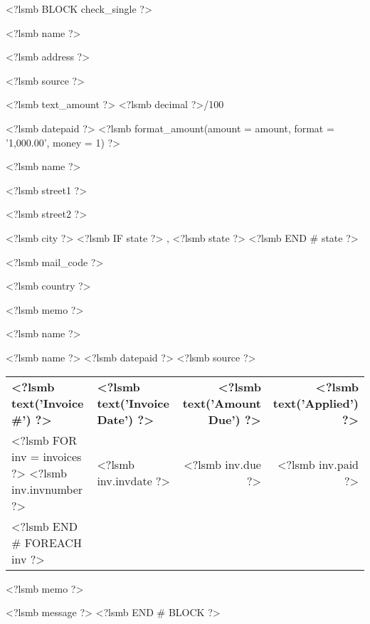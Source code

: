 <?lsmb BLOCK check_single ?>
\parbox[t]{12cm}{
  <?lsmb name ?>

  <?lsmb address ?>}
\hfill
\parbox[t]{6cm}{\hfill <?lsmb source ?>}

\vspace*{0.6cm}

<?lsmb text_amount ?> \dotfill <?lsmb decimal ?>/100 \makebox[0.5cm]{\hfill}

\vspace{0.5cm}

\hfill <?lsmb datepaid ?> \makebox[2cm]{\hfill} <?lsmb 
format_amount({amount = amount, format = '1,000.00', money = 1}) ?>


\vspace{0.5cm}

<?lsmb name ?>

<?lsmb street1 ?>

<?lsmb street2 ?>

<?lsmb city ?>
<?lsmb IF state ?>
\hspace{-0.1cm}, <?lsmb state ?>
<?lsmb END # state ?>

<?lsmb mail_code ?>

<?lsmb country ?>

\vspace{1.8cm}

<?lsmb memo ?>

\vspace{0.8cm}

<?lsmb name ?>

\vspace{0.5cm}

<?lsmb name ?> \hfill <?lsmb datepaid ?> \hfill <?lsmb source ?>

\vspace{0.5cm}
\begin{tabularx}{\textwidth}{lXrr@{}}
\textbf{<?lsmb text('Invoice #') ?>} & \textbf{<?lsmb text('Invoice Date') ?>}
  & \textbf{<?lsmb text('Amount Due') ?>} & \textbf{<?lsmb text('Applied') ?>} \\
<?lsmb FOR inv = invoices ?>
<?lsmb inv.invnumber ?> & <?lsmb inv.invdate ?> \dotfill
  & <?lsmb inv.due ?> & <?lsmb inv.paid ?> \\
<?lsmb END # FOREACH inv ?>
\end{tabularx}

\vspace{1cm}

<?lsmb memo ?>

\vfill
<?lsmb message ?>
<?lsmb END # BLOCK ?>
